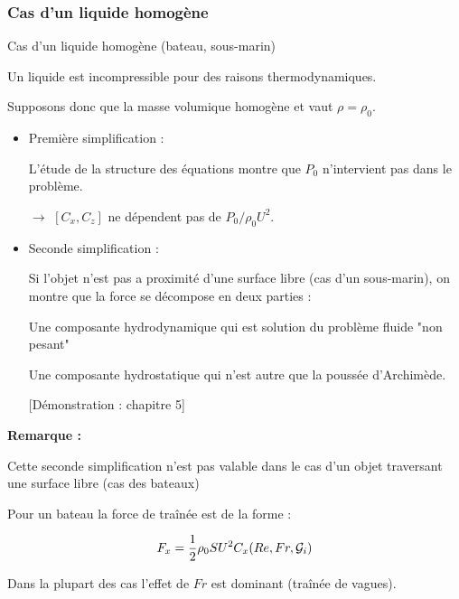 \subsubsection{Cas d'un liquide homogène}
\begin{frame}{Cas d'un liquide homogène (bateau, sous-marin)}

\small

Un liquide est incompressible pour des raisons thermodynamiques.

Supposons donc que la masse volumique homogène et vaut $\rho = \rho_0$.


\medskip
\pause 

\begin{itemize} 
\item Première simplification :

L'étude de la structure des équations montre que $P_0$ n'intervient pas dans le problème.

$\rightarrow$  $[C_x,C_z]$ ne dépendent pas de $P_0/\rho_0 U^2$.


\smallskip
\pause 

\item Seconde simplification : 

Si l'objet n'est pas a proximité d'une surface libre (cas d'un sous-marin), on montre  que la force se décompose en deux parties : 

Une composante hydrodynamique qui est solution du problème fluide "non pesant"   

Une composante hydrostatique qui n'est autre que la poussée d'Archimède.
 

{\color{vert}[Démonstration : chapitre 5]}

\end{itemize}

\pause
\medskip
{\bf Remarque : }

Cette seconde simplification n'est pas valable dans le cas d'un objet traversant une surface libre 
(cas des bateaux)
\smallskip
\pause 

Pour un bateau la force de traînée est de la forme :

$$
{F_x} = \frac{1}{2} \rho_0 S U^2 C_x(Re,Fr, {\cal G}_i) 
$$

Dans la plupart des cas l'effet de $Fr$ est dominant  (traînée de vagues).


\end{frame}

